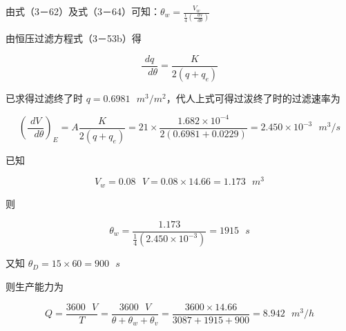 \documentclass[
]{article}
\begin{document}
由式（3－62）及式（3－64）可知：\(\theta_{w} = \frac{V_{w}}{\frac{1}{4}\left( \frac{\text{\ }dV}{\text{\ }d\theta} \right)}\)

由恒压过滤方程式（3－53b）得

\[\frac{dq}{\text{\ }d\theta} = \frac{K}{2\left( q + q_{e} \right)}\]

已求得过滤终了时 \(q = 0.6981{\text{\ }m}^{3}/m^{2}\)，代人上式可得过沷终了时的过滤速率为

\[\left( \frac{dV}{\text{\ }d\theta} \right)_{E} = A\frac{K}{2\left( q + q_{e} \right)} = 21 \times \frac{1.682 \times 10^{- 4}}{2(0.6981 + 0.0229)} = 2.450 \times 10^{- 3}{\text{\ }m}^{3}/s\]

已知

\[V_{w} = 0.08\text{\ }V = 0.08 \times 14.66 = 1.173{\text{\ }m}^{3}\]

则

\[\theta_{w} = \frac{1.173}{\frac{1}{4}\left( 2.450 \times 10^{- 3} \right)} = 1915\text{\ }s\]

又知 \(\theta_{D} = 15 \times 60 = 900\text{\ }s\)

则生产能力为

\[Q = \frac{3600\text{\ }V}{T} = \frac{3600\text{\ }V}{\theta + \theta_{w} + \theta_{v}} = \frac{3600 \times 14.66}{3087 + 1915 + 900} = 8.942{\text{\ }m}^{3}/h\]
\end{document}
